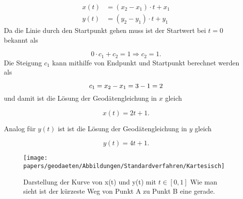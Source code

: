 \begin{align}
	x(t) &= (x_2 - x_1) \cdot t + x_1 \\
	y(t) &= (y_2 - y_1) \cdot t + y_1
\end{align}
Da die Linie durch den Startpunkt gehen muss ist der Startwert bei $t=0$ bekannt als
 
\begin{equation}
	0 \cdot c_1 + c_2 = 1 \Rightarrow c_2 = 1 .	
\end{equation}
Die Steigung $c_1$ kann mithilfe von Endpunkt und Startpunkt berechnet werden als

\begin{equation}
	c_1 = x_2 - x_1 \\ = 3-1 \\ = 2
\end{equation}
und damit ist die Lösung der Geodätengleichung in $x$ gleich

\begin{equation}
	x(t) = 2t + 1 .
\end{equation}

Analog für $y(t)$ ist ist die Lösung der Geodätengleichung in $y$ gleich

\begin{equation}
	y(t) = 4t + 1 .
\end{equation}

\begin{figure}
	\centering
	\texttt{[image: papers/geodaeten/Abbildungen/Standardverfahren/Kartesisch]}
	\label{geodaeten:figure:Standardverfahren:Kartesisch:figure1}
	\caption{Darstellung der Kurve von x(t) und y(t) mit $t \in [0 , 1]$ Wie man sieht ist der kürzeste Weg von Punkt A zu Punkt B eine gerade.}
\end{figure}
